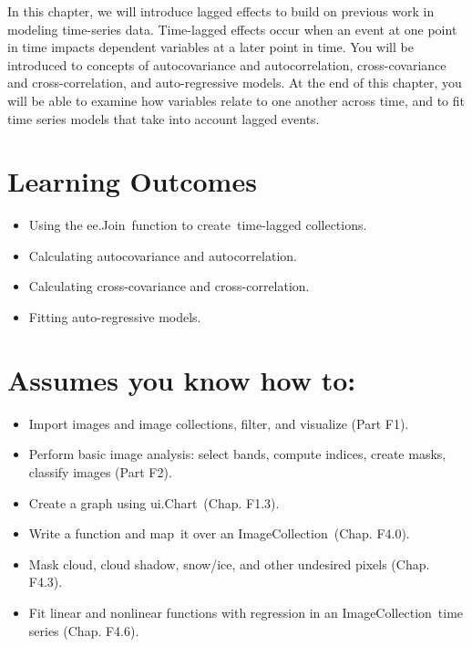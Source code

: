 \documentclass[
  letterpaper,
  DIV=11,
  numbers=noendperiod]{scrreprt}
\providecommand{\tightlist}{%
  \setlength{\itemsep}{0pt}\setlength{\parskip}{0pt}}\usepackage{longtable,booktabs,array}
\begin{document}
In this chapter, we will introduce lagged effects to build on previous
work in modeling time-series data. Time-lagged effects occur when an
event at one point in time impacts dependent variables at a later point
in time. You will be introduced to concepts of autocovariance and
autocorrelation, cross-covariance and cross-correlation, and
auto-regressive models. At the end of this chapter, you will be able to
examine how variables relate to one another across time, and to fit time
series models that take into account lagged events.~

\hypertarget{learning-outcomes-16}{%
\section*{Learning Outcomes}\label{learning-outcomes-16}}


\begin{itemize}
\tightlist
\item
  Using the ee.Join~function to create~time-lagged collections.
\item
  Calculating autocovariance and autocorrelation.
\item
  Calculating cross-covariance and cross-correlation.
\item
  Fitting auto-regressive models.
\end{itemize}

\hypertarget{assumes-you-know-how-to-16}{%
\section*{Assumes you know how to:}\label{assumes-you-know-how-to-16}}


\begin{itemize}
\tightlist
\item
  Import images and image collections, filter, and visualize (Part F1).
\item
  Perform basic image analysis: select bands, compute indices, create
  masks, classify images (Part F2).
\item
  \hspace{0pt}\hspace{0pt}Create a graph using ui.Chart~(Chap. F1.3).
\item
  Write a function and map~it over an ImageCollection~(Chap. F4.0).
\item
  Mask cloud, cloud shadow, snow/ice, and other undesired pixels (Chap.
  F4.3).
\item
  Fit linear and nonlinear functions with regression in an
  ImageCollection~time series (Chap. F4.6).
\end{itemize}
\end{document}
